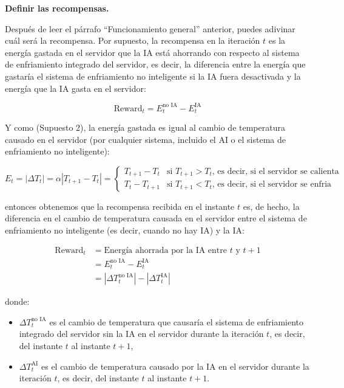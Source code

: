 \documentclass[
]{book}
\providecommand{\tightlist}{%
  \setlength{\itemsep}{0pt}\setlength{\parskip}{0pt}}
\begin{document}
\textbf{Definir las recompensas.}

Después de leer el párrafo ``Funcionamiento general'' anterior, puedes adivinar cuál será la recompensa. Por supuesto, la recompensa en la iteración \(t\) es la energía gastada en el servidor que la IA está ahorrando con respecto al sistema de enfriamiento integrado del servidor, es decir, la diferencia entre la energía que gastaría el sistema de enfriamiento no inteligente si la IA fuera desactivada y la energía que la IA gasta en el servidor:

\[\textrm{Reward}_t = E_t^{\textrm{no IA}} - E_t^{\textrm{IA}}\]

Y como (Supuesto 2), la energía gastada es igual al cambio de temperatura causado en el servidor (por cualquier sistema, incluido el AI o el sistema de enfriamiento no inteligente):

\begin{equation*}
E_t = |\Delta T_t| = \alpha |T_{t+1} - T_t| =
\begin{cases}
T_{t+1} - T_t & \textrm{si $T_{t+1} > T_t$, es decir, si el servidor se calienta} \\
T_t - T_{t+1} & \textrm{si $T_{t+1} < T_t$, es decir, si el servidor se enfria}
\end{cases}
\end{equation*}

entonces obtenemos que la recompensa recibida en el instante \(t\) es, de hecho, la diferencia en el cambio de temperatura causada en el servidor entre el sistema de enfriamiento no inteligente (es decir, cuando no hay IA) y la IA:

\begin{align*}
    \textrm{Reward}_t
    & = \textrm{Energía ahorrada por la IA entre $t$ y $t+1$} \\
    & = E_t^{\textrm{no IA}} - E_t^{\textrm{IA}} \\
    & = |\Delta T_t^{\textrm{no IA}}| - |\Delta T_t^{\textrm{IA}}|
\end{align*}

donde:

\begin{itemize}
\tightlist
\item
  \(\Delta T_t^{\textrm{no IA}}\) es el cambio de temperatura que causaría el sistema de enfriamiento integrado del servidor sin la IA en el servidor durante la iteración \(t\), es decir, del instante \(t\) al instante \(t + 1\),
\item
  \(\Delta T_t^{\textrm{AI}}\) es el cambio de temperatura causado por la IA en el servidor durante la iteración \(t\), es decir, del instante \(t\) al instante \(t + 1\).
\end{itemize}
\end{document}
